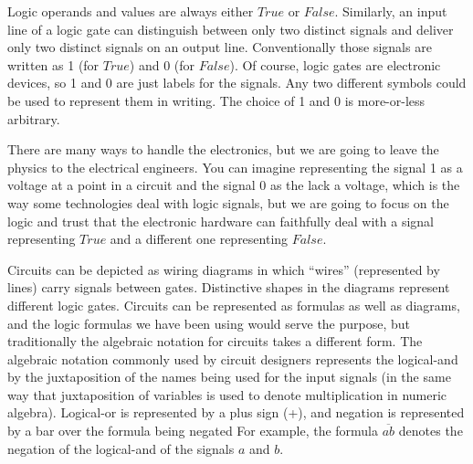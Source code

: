 Logic operands and values are always either $True$ or $False$.
Similarly, an input line of a logic gate can distinguish between
only two distinct signals
and deliver only two distinct signals on an output line.
Conventionally those signals are written as 1 (for $True$) and 0 (for $False$).
Of course, logic gates are electronic devices,
so 1 and 0 are just labels for the signals.
Any two different symbols could be used to represent them in writing.
The choice of 1 and 0 is more-or-less arbitrary.

There are many ways to handle the electronics,
but we are going to leave the physics to the electrical engineers.
You can imagine representing the signal 1 as
a voltage at a point in a circuit and the signal 0 as
the lack a voltage, which is the way some technologies
deal with logic signals,
but we are going to focus on the logic and trust that
the electronic hardware can faithfully deal with
a signal representing $True$ and a different one representing $False$.

Circuits can be depicted as wiring diagrams
in which ``wires'' (represented by lines) carry signals between gates.
Distinctive shapes in the diagrams represent different logic gates.
Circuits can be represented as formulas as well as diagrams, and
the logic formulas we have been using would serve the purpose,
but traditionally the algebraic notation for circuits takes a
different form.
The algebraic notation commonly used by circuit
designers represents the logical-and by the juxtaposition
of the names being used for the input signals (in the same way
that juxtaposition of variables is used to denote multiplication
in numeric algebra). Logical-or is represented by a plus sign (+),
and negation is represented by a bar over the formula being negated
For example, the formula $\overline{ab}$ denotes the negation of the logical-and
of the signals $a$ and $b$.

